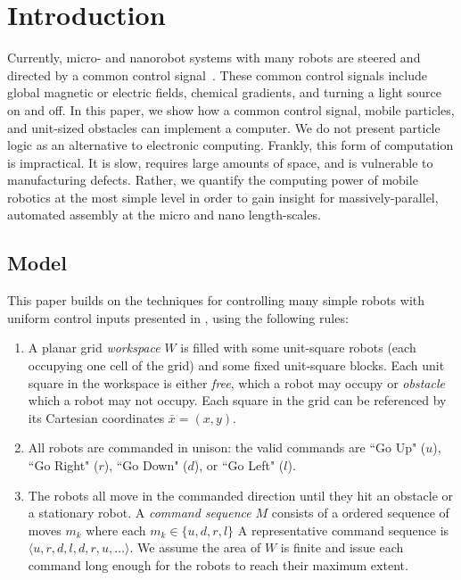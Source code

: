 \documentclass[letterpaper, 10 pt, conference]{ieeeconf}
\begin{document}
\section{Introduction}
    
  Currently, micro- and nanorobot systems with many robots are steered and directed by a common control signal~\cite{Donald2013,Chiang2011,Hsi-Wen2012,Diller2013,Jing2013,Ou2013,Lanauze2013}. These common control signals include global magnetic or electric fields, chemical gradients, and turning a light source on and off.  In this paper, we show how a common control signal, mobile particles, and unit-sized obstacles can implement a computer.  
    We do not present particle logic as an alternative to electronic computing.
  Frankly, this form of computation is impractical. It is slow, requires large amounts of space, and is vulnerable to manufacturing defects. Rather, we quantify the computing power of mobile robotics at the most simple level in order to gain insight for massively-parallel, automated assembly at the micro and nano length-scales.

 \subsection{Model}
  
  This paper builds on the techniques for controlling many simple robots with uniform control inputs presented in \cite{Becker2013f,Becker2014,Becker2014a}, using the following rules:
\begin{enumerate}
\item A planar  grid \emph{workspace} $W$ is filled with some unit-square robots (each occupying one cell of the grid)  and some fixed unit-square blocks.  Each unit square in the workspace is either  \emph{free}, which a robot may occupy or \emph{obstacle} which a robot may not occupy.  Each square in the grid can be referenced by its Cartesian coordinates $\bar{x}=(x,y)$.
\item All robots are commanded in unison: the valid commands are  ``Go Up" ($u$), ``Go Right" ($r$), ``Go Down" ($d$), or ``Go Left" ($l$).  
\item The robots all move in the commanded direction until they hit an obstacle or a stationary robot. A \emph{command sequence} $M$ consists of a ordered sequence of moves $m_k$ where each $m_k\in\{u,d,r,l\}$  A representative command sequence is $\langle u,r,d,l,d,r,u,\ldots\rangle$. We assume the area of $W$ is finite and issue each command long enough for the robots to reach their maximum extent.
\end{enumerate}
\end{document}
